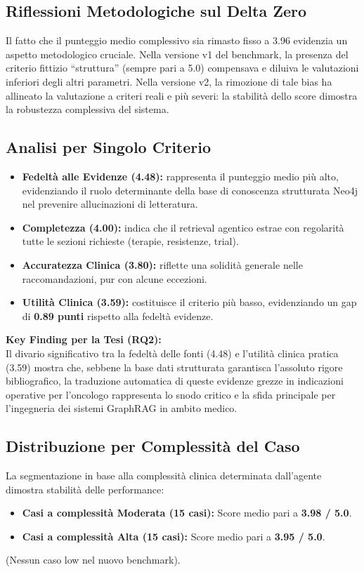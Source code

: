 \documentclass[12pt, a4paper]{article}
\begin{document}
\subsection{Riflessioni Metodologiche sul Delta Zero}
Il fatto che il punteggio medio complessivo sia rimasto fisso a 3.96 evidenzia un aspetto metodologico cruciale. Nella versione v1 del benchmark, la presenza del criterio fittizio ``struttura'' (sempre pari a 5.0) compensava e diluiva le valutazioni inferiori degli altri parametri. Nella versione v2, la rimozione di tale bias ha allineato la valutazione a criteri reali e più severi: la stabilità dello score dimostra la robustezza complessiva del sistema.

\subsection{Analisi per Singolo Criterio}
\begin{itemize}[leftmargin=1.6em, itemsep=2pt]
  \item \textbf{Fedeltà alle Evidenze (4.48):} rappresenta il punteggio medio più alto, evidenziando il ruolo determinante della base di conoscenza strutturata Neo4j nel prevenire allucinazioni di letteratura.
  \item \textbf{Completezza (4.00):} indica che il retrieval agentico estrae con regolarità tutte le sezioni richieste (terapie, resistenze, trial).
  \item \textbf{Accuratezza Clinica (3.80):} riflette una solidità generale nelle raccomandazioni, pur con alcune eccezioni.
  \item \textbf{Utilità Clinica (3.59):} costituisce il criterio più basso, evidenziando un gap di \textbf{0.89 punti} rispetto alla fedeltà evidenze.
\end{itemize}

\begin{insightbox}
\textbf{Key Finding per la Tesi (RQ2):}
\\
Il divario significativo tra la fedeltà delle fonti (4.48) e l'utilità clinica pratica (3.59) mostra che, sebbene la base dati strutturata garantisca l'assoluto rigore bibliografico, la traduzione automatica di queste evidenze grezze in indicazioni operative per l'oncologo rappresenta lo snodo critico e la sfida principale per l'ingegneria dei sistemi GraphRAG in ambito medico.
\end{insightbox}

\subsection{Distribuzione per Complessità del Caso}
La segmentazione in base alla complessità clinica determinata dall'agente dimostra stabilità delle performance:
\begin{itemize}[leftmargin=1.6em, itemsep=2pt]
  \item \textbf{Casi a complessità Moderata (15 casi):} Score medio pari a \textbf{3.98 / 5.0}.
  \item \textbf{Casi a complessità Alta (15 casi):} Score medio pari a \textbf{3.95 / 5.0}.
\end{itemize}
(Nessun caso low nel nuovo benchmark).
\end{document}
